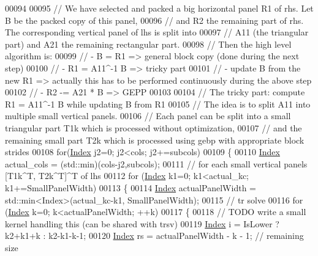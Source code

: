 \begin{DoxyCode}
00094 
00095       \textcolor{comment}{// We have selected and packed a big horizontal panel R1 of rhs. Let B be the packed copy of this
       panel,}
00096       \textcolor{comment}{// and R2 the remaining part of rhs. The corresponding vertical panel of lhs is split into}
00097       \textcolor{comment}{// A11 (the triangular part) and A21 the remaining rectangular part.}
00098       \textcolor{comment}{// Then the high level algorithm is:}
00099       \textcolor{comment}{//  - B = R1                    => general block copy (done during the next step)}
00100       \textcolor{comment}{//  - R1 = A11^-1 B             => tricky part}
00101       \textcolor{comment}{//  - update B from the new R1  => actually this has to be performed continuously during the above
       step}
00102       \textcolor{comment}{//  - R2 -= A21 * B             => GEPP}
00103 
00104       \textcolor{comment}{// The tricky part: compute R1 = A11^-1 B while updating B from R1}
00105       \textcolor{comment}{// The idea is to split A11 into multiple small vertical panels.}
00106       \textcolor{comment}{// Each panel can be split into a small triangular part T1k which is processed without optimization,}
00107       \textcolor{comment}{// and the remaining small part T2k which is processed using gebp with appropriate block strides}
00108       \textcolor{keywordflow}{for}(\hyperlink{namespace_eigen_a62e77e0933482dafde8fe197d9a2cfde}{Index} j2=0; j2<cols; j2+=subcols)
00109       \{
00110         \hyperlink{namespace_eigen_a62e77e0933482dafde8fe197d9a2cfde}{Index} actual\_cols = (std::min)(cols-j2,subcols);
00111         \textcolor{comment}{// for each small vertical panels [T1k^T, T2k^T]^T of lhs}
00112         \textcolor{keywordflow}{for} (\hyperlink{namespace_eigen_a62e77e0933482dafde8fe197d9a2cfde}{Index} k1=0; k1<actual\_kc; k1+=SmallPanelWidth)
00113         \{
00114           \hyperlink{namespace_eigen_a62e77e0933482dafde8fe197d9a2cfde}{Index} actualPanelWidth = std::min<Index>(actual\_kc-k1, SmallPanelWidth);
00115           \textcolor{comment}{// tr solve}
00116           \textcolor{keywordflow}{for} (\hyperlink{namespace_eigen_a62e77e0933482dafde8fe197d9a2cfde}{Index} k=0; k<actualPanelWidth; ++k)
00117           \{
00118             \textcolor{comment}{// TODO write a small kernel handling this (can be shared with trsv)}
00119             \hyperlink{namespace_eigen_a62e77e0933482dafde8fe197d9a2cfde}{Index} i  = IsLower ? k2+k1+k : k2-k1-k-1;
00120             \hyperlink{namespace_eigen_a62e77e0933482dafde8fe197d9a2cfde}{Index} rs = actualPanelWidth - k - 1; \textcolor{comment}{// remaining size}

\end{DoxyCode}
